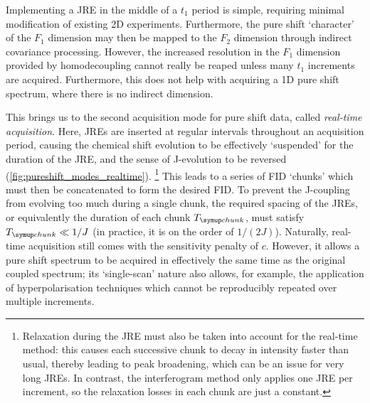 Implementing a JRE in the middle of a $t_1$ period is simple, requiring minimal modification of existing 2D experiments.
Furthermore, the pure shift `character' of the $F_1$ dimension may then be mapped to the $F_2$ dimension through indirect covariance processing\autocite{Bruschweiler2004JCP,Zhang2004JACS,Jaeger2014ARNMRS,Morris2010JACS,Aguilar2012ACIE,Foroozandeh2014JACS}.
However, the increased resolution in the $F_1$ dimension provided by homodecoupling cannot really be reaped unless many $t_1$ increments are acquired.
Furthermore, this does not help with acquiring a 1D pure shift spectrum, where there is no indirect dimension.

This brings us to the second acquisition mode for pure shift data, called \textit{real-time acquisition}\autocite{Lupulescu2012JMR,Meyer2013ACIE,Mauhart2015JMR,Kiraly2018MRC}.
Here, JREs are inserted at regular intervals throughout an acquisition period, causing the chemical shift evolution to be effectively `suspended' for the duration of the JRE, and the sense of J-evolution to be reversed (\cref{fig:pureshift_modes_realtime}).%
\footnote{Relaxation during the JRE must also be taken into account for the real-time method: this causes each successive chunk to decay in intensity faster than usual, thereby leading to peak broadening, which can be an issue for very long JREs.
In contrast, the interferogram method only applies one JRE per increment, so the relaxation losses in each chunk are just a constant.}
This leads to a series of FID `chunks' which must then be concatenated to form the desired FID.
To prevent the J-coupling from evolving too much during a single chunk, the required spacing of the JREs, or equivalently the duration of each chunk $\Tchunk$, must satisfy $\Tchunk \ll 1/J\/$ (in practice, it is on the order of $1/(2J)$).
Naturally, real-time acquisition still comes with the sensitivity penalty of $c$.
However, it allows a pure shift spectrum to be acquired in effectively the same time as the original coupled spectrum; its `single-scan' nature also allows, for example, the application of hyperpolarisation techniques which cannot be reproducibly repeated over multiple increments.\autocite{Donovan2014ACIE,Taylor2021MRC}

